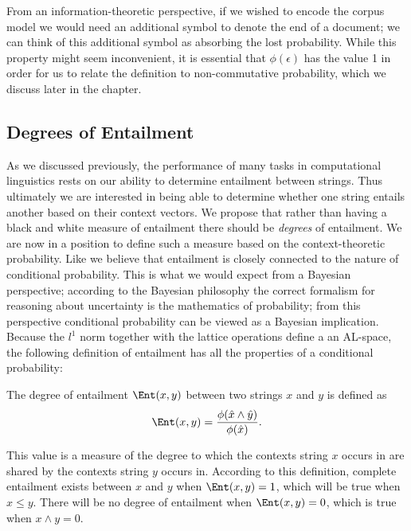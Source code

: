 From an information-theoretic perspective, if we wished to encode the corpus model we would need an additional symbol to denote the end of a document; we can think of this additional symbol as absorbing the lost probability. While this property might seem inconvenient, it is essential that $\phi(\epsilon)$ has the value 1 in order for us to relate the definition to non-commutative probability, which we discuss later in the chapter.


\subsection{Degrees of Entailment}

As we discussed previously, the performance of many tasks in computational linguistics rests on our ability to determine entailment between strings. Thus ultimately we are interested in being able to determine whether one string entails another based on their context vectors.
We propose that rather than having a black and white measure of entailment there should be \emph{degrees} of entailment. We are now in a position to define such a measure based on the context-theoretic probability. Like \cite{Glickman:05} we believe that entailment is closely connected to the nature of conditional probability. This is what we would expect from a Bayesian perspective; according to the Bayesian philosophy the correct formalism for reasoning about uncertainty is the mathematics of probability; from this perspective conditional probability can be viewed as a Bayesian implication. Because the $l^1$ norm together with the lattice operations define a an AL-space, the following definition of entailment has all the properties of a conditional probability:
\begin{defn}
The degree of entailment $\Ent(x,y)$ between two strings $x$ and $y$ is defined as
$$\Ent(x,y) = \frac{\phi(\hat{x}\land\hat{y})}{\phi(\hat{x})}.$$
\end{defn}
This value is a measure of the degree to which the contexts string $x$ occurs in are shared by the contexts string $y$ occurs in.  According to this definition, complete entailment exists between $x$ and $y$ when $\Ent(x,y) = 1$, which will be true when $x \le y$. There will be no degree of entailment when $\Ent(x,y) = 0$, which is true when $x \land y = 0$.

